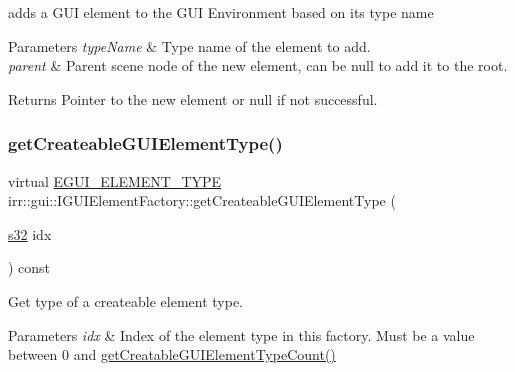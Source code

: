 adds a G\+UI element to the G\+UI Environment based on its type name 


\begin{DoxyParams}{Parameters}
{\em type\+Name} & Type name of the element to add. \\
\hline
{\em parent} & Parent scene node of the new element, can be null to add it to the root. \\
\hline
\end{DoxyParams}
\begin{DoxyReturn}{Returns}
Pointer to the new element or null if not successful. 
\end{DoxyReturn}
\mbox{\label{classirr_1_1gui_1_1IGUIElementFactory_a9318ddb2d0d971551db4c050c3f99a2f}} 
\subsubsection{\texorpdfstring{get\+Createable\+G\+U\+I\+Element\+Type()}{getCreateableGUIElementType()}\hspace{0.1cm}{\footnotesize\ttfamily [1/2]}}
{\footnotesize\ttfamily virtual \hyperlink{namespaceirr_1_1gui_ae4d66df0ecf4117cdbcf9f22404bd254}{E\+G\+U\+I\+\_\+\+E\+L\+E\+M\+E\+N\+T\+\_\+\+T\+Y\+PE} irr\+::gui\+::\+I\+G\+U\+I\+Element\+Factory\+::get\+Createable\+G\+U\+I\+Element\+Type (\begin{DoxyParamCaption}\item[{\hyperlink{namespaceirr_ac66849b7a6ed16e30ebede579f9b47c6}{s32}}]{idx }\end{DoxyParamCaption}) const\hspace{0.3cm}{\ttfamily [pure virtual]}}



Get type of a createable element type. 


\begin{DoxyParams}{Parameters}
{\em idx} & Index of the element type in this factory. Must be a value between 0 and \hyperlink{classirr_1_1gui_1_1IGUIElementFactory_aae56378de5264978e70d11a36fff02e9}{get\+Creatable\+G\+U\+I\+Element\+Type\+Count()} \\
\hline
\end{DoxyParams}
\mbox{\label{classirr_1_1gui_1_1IGUIElementFactory_a9318ddb2d0d971551db4c050c3f99a2f}} 
